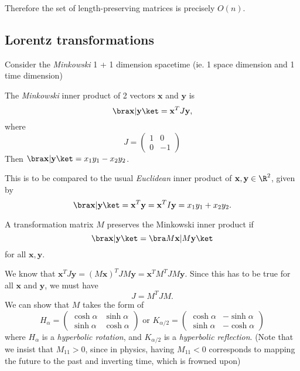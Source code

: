 \documentclass[a4paper]{article}
\begin{document}
      Therefore the set of length-preserving matrices is precisely $O(n)$.

      \subsection{Lorentz transformations}
      Consider the \emph{Minkowski} 1 + 1 dimension spacetime (ie. 1 space dimension and 1 time dimension)

      \begin{defi}
        The \emph{Minkowski} inner product of 2 vectors $\mathbf{x}$ and $\mathbf{y}$ is
        \[
          \bra \mathbf{x}|\mathbf{y}\ket = \mathbf{x}^TJ\mathbf{y},
        \]
        where
        \[
          J = 
          \begin{pmatrix}
            1 & 0\\
            0 & -1
          \end{pmatrix}
        \]
        Then $\bra \mathbf{x}|\mathbf{y}\ket = x_1y_1 - x_2y_2$.
      \end{defi}
      This is to be compared to the usual \emph{Euclidean} inner product of $\mathbf{x}, \mathbf{y}\in \R^2$, given by
      \[
        \bra \mathbf{x}|\mathbf{y}\ket = \mathbf{x}^T\mathbf{y} = \mathbf{x}^TI\mathbf{y} = x_1y_1 + x_2y_2.
      \]

      \begin{defi}
        A transformation matrix $M$ preserves the Minkowski inner product if
        \[
          \bra \mathbf{x}|\mathbf{y}\ket = \bra M\mathbf{x} | M\mathbf{y}\ket
        \]
        for all $\mathbf{x}, \mathbf{y}$.
      \end{defi}

      We know that $\mathbf{x}^TJ\mathbf{y} = (M\mathbf{x})^TJM\mathbf{y} = \mathbf{x}^T M^TJM\mathbf{y}$. Since this has to be true for all $\mathbf{x}$ and $\mathbf{y}$, we must have
      \[
        J = M^TJM.
      \]
      We can show that $M$ takes the form of
      \[
        H_\alpha = \begin{pmatrix}
          \cosh \alpha & \sinh \alpha\\
          \sinh \alpha & \cosh \alpha
        \end{pmatrix}\text{ or } K_{\alpha/2} = 
        \begin{pmatrix}
          \cosh\alpha & -\sinh\alpha\\
          \sinh\alpha & -\cosh\alpha
        \end{pmatrix}
      \]
      where $H_\alpha$ is a \emph{hyperbolic rotation}, and $K_{\alpha/2}$ is a \emph{hyperbolic reflection}. (Note that we insist that $M_{11} > 0$, since in physics, having $M_{11} < 0$ corresponds to mapping the future to the past and inverting time, which is frowned upon)
\end{document}
